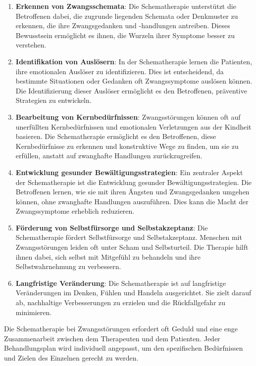 \begin{enumerate}
  \item \textbf{Erkennen von Zwangsschemata}: Die Schematherapie unterstützt die Betroffenen dabei, die zugrunde liegenden Schemata oder Denkmuster zu erkennen, die ihre Zwangsgedanken und -handlungen antreiben. Dieses Bewusstsein ermöglicht es ihnen, die Wurzeln ihrer Symptome besser zu verstehen.

  \item \textbf{Identifikation von Auslösern}: In der Schematherapie lernen die Patienten, ihre emotionalen Auslöser zu identifizieren. Dies ist entscheidend, da bestimmte Situationen oder Gedanken oft Zwangssymptome auslösen können. Die Identifizierung dieser Auslöser ermöglicht es den Betroffenen, präventive Strategien zu entwickeln.

  \item \textbf{Bearbeitung von Kernbedürfnissen}: Zwangsstörungen können oft auf unerfüllten Kernbedürfnissen und emotionalen Verletzungen aus der Kindheit basieren. Die Schematherapie ermöglicht es den Betroffenen, diese Kernbedürfnisse zu erkennen und konstruktive Wege zu finden, um sie zu erfüllen, anstatt auf zwanghafte Handlungen zurückzugreifen.

  \item \textbf{Entwicklung gesunder Bewältigungsstrategien}: Ein zentraler Aspekt der Schematherapie ist die Entwicklung gesunder Bewältigungsstrategien. Die Betroffenen lernen, wie sie mit ihren Ängsten und Zwangsgedanken umgehen können, ohne zwanghafte Handlungen auszuführen. Dies kann die Macht der Zwangssymptome erheblich reduzieren.

  \item \textbf{Förderung von Selbstfürsorge und Selbstakzeptanz}: Die Schematherapie fördert Selbstfürsorge und Selbstakzeptanz. Menschen mit Zwangsstörungen leiden oft unter Scham und Selbsturteil. Die Therapie hilft ihnen dabei, sich selbst mit Mitgefühl zu behandeln und ihre Selbstwahrnehmung zu verbessern.

  \item \textbf{Langfristige Veränderung}: Die Schematherapie ist auf langfristige Veränderungen im Denken, Fühlen und Handeln ausgerichtet. Sie zielt darauf ab, nachhaltige Verbesserungen zu erzielen und die Rückfallgefahr zu minimieren.

\end{enumerate}

Die Schematherapie bei Zwangsstörungen erfordert oft Geduld und eine enge Zusammenarbeit zwischen dem Therapeuten und dem Patienten. Jeder Behandlungsplan wird individuell angepasst, um den spezifischen Bedürfnissen und Zielen des Einzelnen gerecht zu werden.

